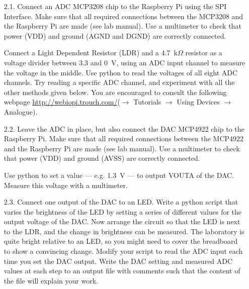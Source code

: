 \vspace*{-0.5cm}
\begin{enumerate}

\item [2.1.] Connect an ADC MCP3208 chip to the Raspberry Pi using the SPI Interface.
Make sure that all required connections between the MCP3208 and the Raspberry Pi are made (see lab manual).
Use a multimeter to check that power (VDD) and ground (AGND and DGND) are correctly connected.

Connect a Light Dependent Resistor (LDR) and a 4.7~k$\Omega$ resistor as a voltage divider between 3.3 and 0~V, using an ADC input channel to measure the voltage in the middle.
Use python to read the voltages of all eight ADC channels.
Try reading a specific ADC channel, and experiment with all the other methods given below.
You are encouraged to consult the following webpage \url{http://webiopi.trouch.com/}($\rightarrow$ Tutorials $\rightarrow$ Using Devices $\rightarrow$ Analogue).


\vspace*{-0.5cm}

\newpage
\item [2.2.] Leave the ADC in place, but also connect the DAC MCP4922 chip to the Raspberry Pi.
Make sure that all required connections between the MCP4922 and the Raspberry Pi are made (see lab manual).
Use a multimeter to check that power (VDD) and ground (AVSS) are correctly connected.

Use python to set a value --- e.g. 1.3~V --- to output VOUTA of the DAC.
Measure this voltage with a multimeter. \\



\item [2.3.] Connect one output of the DAC to an LED.
Write a python script that varies the brightness of the LED by setting a series of different values for the output voltage of the DAC.
Now arrange the circuit so that the LED is next to the LDR, and the change in brightness can be measured.
The laboratory is quite bright relative to an LED, so you might need to cover the breadboard to show a convincing change.
Modify your script to read the ADC input each time you set the DAC output.
Write the DAC setting and measured ADC values at each step to an output file with comments such that the content of the file will explain your work.

\end{enumerate}

